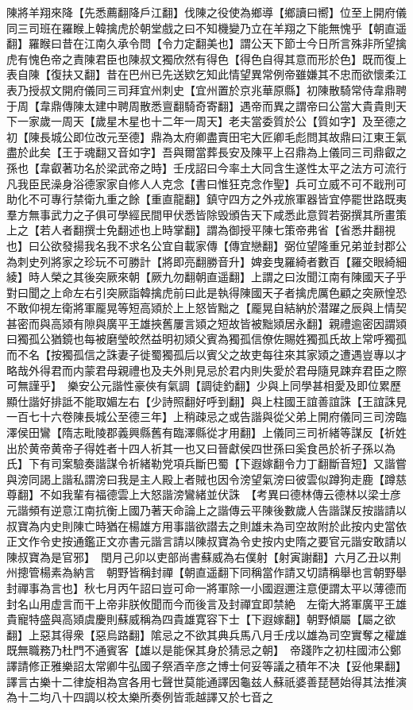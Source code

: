 陳將羊翔來降【先悉薦翻降戶江翻】伐陳之役使為鄉導【鄉讀曰嚮】位至上開府儀同三司班在羅睺上韓擒虎於朝堂戲之曰不知機變乃立在羊翔之下能無愧乎【朝直遥翻】羅睺曰昔在江南久承令問【令力定翻美也】謂公天下節士今日所言殊非所望擒虎有愧色帝之責陳君臣也陳叔文獨欣然有得色【得色自得其意而形於色】既而復上表自陳【復扶又翻】昔在巴州已先送欵乞知此情望異常例帝雖嫌其不忠而欲懷柔江表乃授叔文開府儀同三司拜宜州刺史【宜州置於京兆華原縣】初陳散騎常侍韋鼎聘于周【韋鼎傳陳太建中聘周散悉亶翻騎奇寄翻】遇帝而異之謂帝曰公當大貴貴則天下一家歲一周天【歲星木星也十二年一周天】老夫當委質於公【質如字】及至德之初【陳長城公即位改元至德】鼎為太府卿盡賣田宅大匠卿毛彪問其故鼎曰江東王氣盡於此矣【王于魂翻又音如字】吾與爾當葬長安及陳平上召鼎為上儀同三司鼎叡之孫也【韋叡著功名於梁武帝之時】壬戌詔曰今率土大同含生遂性太平之法方可流行凡我臣民澡身浴德家家自修人人克念【書曰惟狂克念作聖】兵可立威不可不戢刑可助化不可專行禁衛九重之餘【重直龍翻】鎮守四方之外戎旅軍器皆宜停罷世路既夷羣方無事武力之子俱可學經民間甲伏悉皆除毁頒告天下咸悉此意賀若弼撰其所畫策上之【若人者翻撰士免翻述也上時掌翻】謂為御授平陳七策帝弗省【省悉井翻視也】曰公欲發揚我名我不求名公宜自載家傳【傳宜戀翻】弼位望隆重兄弟並封郡公為刺史列將家之珍玩不可勝計【將即亮翻勝音升】婢妾曳羅綺者數百【羅交眼綺細綾】時人榮之其後突厥來朝【厥九勿翻朝直遥翻】上謂之曰汝聞江南有陳國天子乎對曰聞之上命左右引突厥詣韓擒虎前曰此是執得陳國天子者擒虎厲色顧之突厥惶恐不敢仰視左衛將軍龎晃等短高熲於上上怒皆黜之【龎晃自結納於潜躍之辰與上情契甚密而與高熲有隙與廣平王雄挾舊屢言熲之短故皆被黜熲居永翻】親禮逾密因謂熲曰獨孤公猶鏡也每被磨瑩皎然益明初熲父賓為獨孤信僚佐賜姓獨孤氏故上常呼獨孤而不名【按獨孤信之誅妻子徙蜀獨孤后以賓父之故吏每往來其家熲之遭遇豈專以才略哉外得君而内蒙君母親禮也及夫外則見忌於君内則失愛於君母隨見踈弃君臣之際可無謹乎】　樂安公元諧性豪俠有氣調【調徒釣翻】少與上同學甚相愛及即位累歷顯仕諧好排詆不能取媚左右【少詩照翻好呼到翻】與上柱國王誼善誼誅【王誼誅見一百七十六卷陳長城公至德三年】上稍疎忌之或告諧與從父弟上開府儀同三司滂臨澤侯田鸞【隋志毗陵郡義興縣舊有臨澤縣從才用翻】上儀同三司祈緒等謀反【祈姓出於黄帝黄帝子得姓者十四人祈其一也又曰晉獻侯四世孫曰奚食邑於祈子孫以為氏】下有司案驗奏諧謀令祈緒勒党項兵斷巴蜀【下遐嫁翻令力丁翻斷音短】又諧嘗與滂同謁上諧私謂滂曰我是主人殿上者賊也因令滂望氣滂曰彼雲似蹲狗走鹿【蹲慈尊翻】不如我輩有福德雲上大怒諧滂鸞緒並伏誅　【考異曰德林傳云德林以梁士彦元諧頻有逆意江南抗衡上國乃著天命論上之諧傳云平陳後數歲人告諧謀反按諧請以叔寶為内史則陳亡時猶在楊雄方用事諧欲譛去之則雄未為司空故附於此按内史當依正文作令史按通鑑正文亦書元諧言請以陳叔寶為令史按内史隋之要官元諧安敢請以陳叔寶為是官邪】　閏月己卯以吏部尚書蘇威為右僕射【射寅謝翻】六月乙丑以荆州摠管楊素為納言　朝野皆稱封禪【朝直遥翻下同稱當作請又切請稱舉也言朝野舉封禪事為言也】秋七月丙午詔曰豈可命一將軍除一小國遐邇注意便謂太平以薄德而封名山用虚言而干上帝非朕攸聞而今而後言及封禪宜即禁絶　左衛大將軍廣平王雄貴寵特盛與高熲虞慶則蘇威稱為四貴雄寛容下士【下遐嫁翻】朝野傾屬【屬之欲翻】上惡其得衆【惡烏路翻】隂忌之不欲其典兵馬八月壬戌以雄為司空實奪之權雄既無職務乃杜門不通賓客【雄以是能保其身於猜忌之朝】　帝踐阼之初柱國沛公鄭譯請修正雅樂詔太常卿牛弘國子祭酒辛彦之博士何妥等議之積年不决【妥他果翻】譯言古樂十二律旋相為宫各用七聲世莫能通譯因龜兹人蘇祇婆善琵琶始得其法推演為十二均八十四調以校太樂所奏例皆乖越譯又於七音之